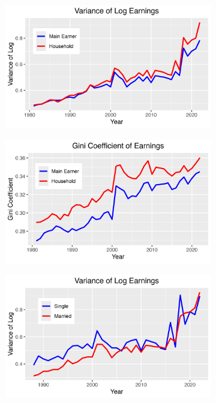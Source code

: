 \documentclass{article}
\begin{document}
\begin{figure}
    \centering
    \begin{subfigure}[t]{0.475\textwidth}
        \centering
        \includegraphics[width=\textwidth]{figures/Fig_3/Fig_3a_Var_indHH.png}
        \label{fig:Indi_to_HH_Var}
    \end{subfigure}
    \begin{subfigure}[t]{0.475\textwidth}
        \centering
        \includegraphics[width=\textwidth]{figures/Fig_3/Fig_3b_Gini_indHH.png}
        \label{fig:Indi_to_HH_Gini}
    \end{subfigure}
    \begin{subfigure}[t]{0.475\textwidth}
        \centering
        \includegraphics[width=\textwidth]{figures/Fig_3/Fig_3c_Var_single.png}

\end{subfigure}
\end{figure}
\end{document}
